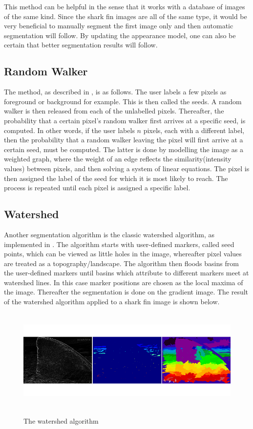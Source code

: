 \documentclass[a4paper,10pt]{article}
\begin{document}
This method can be helpful in the sense that it works with a database of images of the same kind.  Since the shark fin images are all of the same type, 
it would be very beneficial to manually segment the first image only and then automatic segmentation will follow.  By updating the appearance model, 
one can also be certain that better segmentation results will follow.  \\  


\subsection{Random Walker}
The method, as
described in \cite{rw}, is as follows.  The user labels a few
pixels as foreground or background for example.  This is then called the seeds. 
A random walker is then released from each of the unlabelled pixels. 
Thereafter, the probability that a certain pixel's random walker first arrives
at a specific seed, is computed.  In other words, if the user labels $n$
pixels, each with a different label, then the probability that a random walker
leaving the pixel will first arrive at a certain seed, must be
computed.  The latter is done by modelling the image as a weighted graph, where
the weight of an edge reflects the similarity(intensity values) between pixels,
and then solving a system of linear equations.  The pixel is then assigned the label
of the seed for which it is most likely to reach.  The process is repeated until
each pixel is assigned a specific label. 


\subsection{Watershed}
Another segmentation algorithm is the classic watershed algorithm, as
implemented in \cite{scikit}.  The algorithm starts with user-defined markers,
called seed points, which can be viewed as little holes in the image, whereafter
pixel values are treated as a topography/landscape.  The algorithm then floods
basins from the user-defined markers until basins which attribute to different
markers meet at watershed lines.  In this case marker positions are chosen as
the local maxima of the image.  Thereafter the segmentation is done on the
gradient image.  The result of the watershed algorithm applied to a shark fin
image is shown below.

\begin{figure}[H]
\centering
\includegraphics[width=5in,height=2in]{watershed.png} 
\label{fig1}
\caption{The watershed algorithm}
\end{figure}
\end{document}
